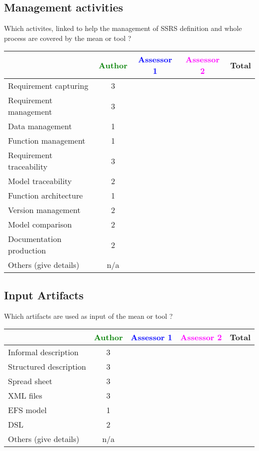 \subsection{Management activities}

Which activites, linked to help the management of SSRS definition and whole process are covered by the mean or tool  ?

\begin{tabular}{|l | c | c | c | c|}
\hline
& \textcolor{green}{Author} & \textcolor{blue}{Assessor 1} & \textcolor{magenta}{Assessor 2} & Total \\
\hline 
Requirement capturing & 3 & & &  \\
\hline
Requirement management  & 3 & & & \\
\hline
Data management & 1 & & & \\
\hline
Function management & 1 & & & \\
\hline
Requirement traceability  & 3 & & & \\
\hline
Model traceability & 2 & & & \\
\hline
Function architecture & 1 & & & \\
\hline
Version management & 2 & & & \\
\hline
Model comparison & 2 & & & \\
\hline
Documentation production & 2 & & & \\
\hline
Others (give details) & n/a & & & \\
\hline
\end{tabular}

\subsection{Input Artifacts}

Which artifacts are used as input of the mean or tool  ? 


\begin{tabular}{|l | c | c | c | c|}
\hline
& \textcolor{green}{Author} & \textcolor{blue}{Assessor 1} & \textcolor{magenta}{Assessor 2} & Total \\
\hline 
Informal description & 3 & & &  \\
\hline
Structured description & 3 & & & \\
\hline
Spread sheet & 3 & & & \\
\hline
XML files & 3 & & & \\
\hline
EFS model & 1 & & & \\
\hline
DSL & 2 & & & \\
\hline
Others (give details) & n/a & & & \\
\hline
\end{tabular}

